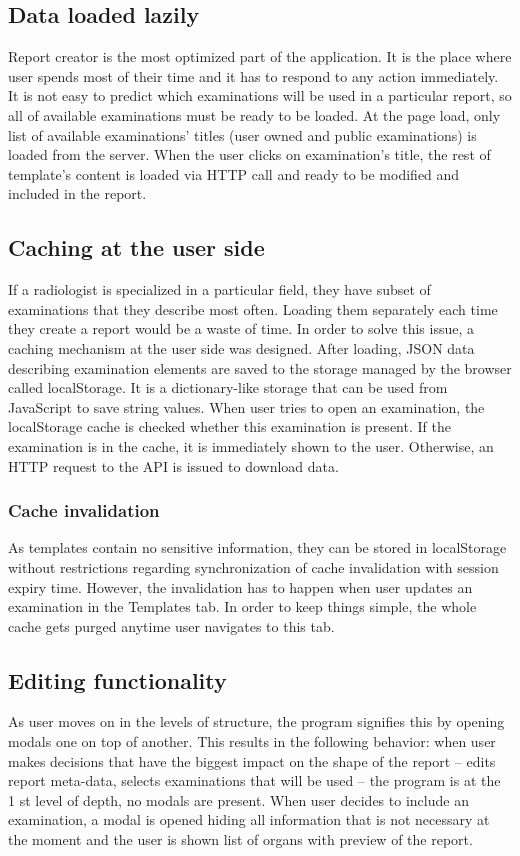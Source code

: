 \documentclass[12pt, twoside, openany]{report}
\theoremstyle{definition}
\begin{document}
\subsection{Data loaded lazily}
Report creator is the most optimized part of the application. It is the place where user spends most of their time and it has to respond to any action immediately. It is not easy to predict which examinations will be used in a particular report, so all of available examinations must be ready to be loaded. At the page load, only list of available examinations' titles (user owned and public examinations) is loaded from the server. When the user clicks on examination's title, the rest of template's content is loaded via HTTP call and ready to be modified and included in the report.  
\subsection{Caching at the user side}
If a radiologist is specialized in a particular field, they have subset of examinations that they describe most often. Loading them separately each time they create a report would be a waste of time. In order to solve this issue, a caching mechanism at the user side was designed. After loading, JSON data describing examination elements are saved to the storage managed by the browser called localStorage. It is a dictionary-like storage that can be used from JavaScript to save string values. When user tries to open an examination, the localStorage cache is checked whether this examination is present. If the examination is in the cache, it is immediately shown to the user. Otherwise, an HTTP request to the API is issued to download data.
\subsubsection{Cache invalidation}
As templates contain no sensitive information, they can be stored in localStorage without restrictions regarding synchronization of cache invalidation with session expiry time. However, the invalidation has to happen when user updates an examination in the Templates tab. In order to keep things simple, the whole cache gets purged anytime user navigates to this tab. 

\subsection{Editing functionality}
As user moves on in the levels of structure, the program signifies this by opening modals one on top of another. This results in the following behavior: when user makes decisions that have the biggest impact on the shape of the report -- edits report meta-data, selects examinations that will be used -- the program is at the 1 st level of depth, no modals are present.
When user decides to include an examination, a modal is opened hiding all information that is not necessary at the moment and the user is shown list of organs with preview of the report.
\end{document}
